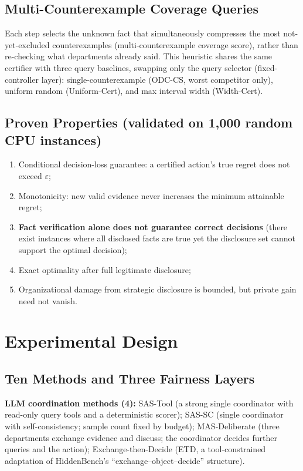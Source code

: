 \documentclass[letterpaper]{article}
\begin{document}
\subsection{Multi-Counterexample Coverage Queries}
Each step selects the unknown fact that simultaneously compresses the most not-yet-excluded counterexamples (multi-counterexample coverage score), rather than re-checking what departments already said. This heuristic shares the same certifier with three query baselines, swapping only the query selector (fixed-controller layer): single-counterexample (ODC-CS, worst competitor only), uniform random (Uniform-Cert), and max interval width (Width-Cert).

\subsection{Proven Properties (validated on 1{,}000 random CPU instances)}
\begin{enumerate}
\item Conditional decision-loss guarantee: a certified action's true regret does not exceed $\varepsilon$;
\item Monotonicity: new valid evidence never increases the minimum attainable regret;
\item \textbf{Fact verification alone does not guarantee correct decisions} (there exist instances where all disclosed facts are true yet the disclosure set cannot support the optimal decision);
\item Exact optimality after full legitimate disclosure;
\item Organizational damage from strategic disclosure is bounded, but private gain need not vanish.
\end{enumerate}

\section{Experimental Design}
\subsection{Ten Methods and Three Fairness Layers}
\textbf{LLM coordination methods (4):} SAS-Tool (a strong single coordinator with read-only query tools and a deterministic scorer); SAS-SC (single coordinator with self-consistency; sample count fixed by budget); MAS-Deliberate (three departments exchange evidence and discuss; the coordinator decides further queries and the action); Exchange-then-Decide (ETD, a tool-constrained adaptation of HiddenBench's ``exchange--object--decide'' structure).
\end{document}
